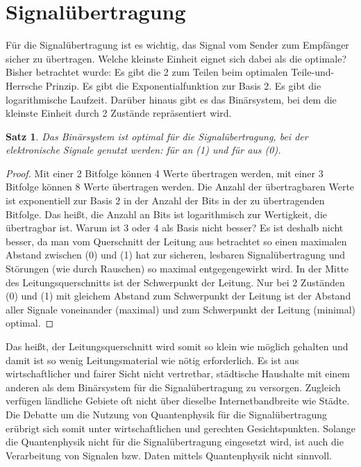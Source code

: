 \documentclass{scrartcl}
\newtheorem{satz}{Satz}[section]
\numberwithin{equation}{section}
\begin{document}
\section{Signalübertragung}
Für die Signalübertragung ist es wichtig, das Signal vom Sender zum Empfänger sicher zu übertragen. Welche kleinste Einheit eignet sich dabei als die optimale? Bisher betrachtet wurde: Es gibt die 2 zum Teilen beim optimalen Teile-und-Herrsche Prinzip. Es gibt die Exponentialfunktion zur Basis 2. Es gibt die logarithmische Laufzeit. Darüber hinaus gibt es das Binärsystem, bei dem die kleinste Einheit durch 2 Zustände repräsentiert wird.
\begin{satz}
	Das Binärsystem ist optimal für die Signalübertragung, bei der elektronische Signale genutzt werden: für an (1) und für aus (0).
\end{satz}
\begin{proof}
	Mit einer 2 Bitfolge können 4 Werte übertragen werden, mit einer 3 Bitfolge können 8 Werte übertragen werden. Die Anzahl der übertragbaren Werte ist exponentiell zur Basis 2 in der Anzahl der Bits in der zu übertragenden Bitfolge. Das heißt, die Anzahl an Bits ist logarithmisch zur Wertigkeit, die übertragbar ist. Warum ist 3 oder 4 als Basis nicht besser? Es ist deshalb nicht besser, da man vom Querschnitt der Leitung aus betrachtet so einen maximalen Abstand zwischen (0) und (1) hat zur sicheren, lesbaren Signalübertragung und Störungen (wie durch Rauschen) so maximal entgegengewirkt wird. In der Mitte des Leitungsquerschnitts ist der Schwerpunkt der Leitung. Nur bei 2 Zuständen (0) und (1) mit gleichem Abstand zum Schwerpunkt der Leitung ist der Abstand aller Signale voneinander (maximal) und zum Schwerpunkt der Leitung (minimal) optimal.	
\end{proof}
Das heißt, der Leitungsquerschnitt wird somit so klein wie möglich gehalten und damit ist so wenig Leitungsmaterial wie nötig erforderlich. Es ist aus wirtschaftlicher und fairer Sicht nicht vertretbar, städtische Haushalte mit einem anderen als dem Binärsystem für die Signalübertragung zu versorgen. Zugleich verfügen ländliche Gebiete oft nicht über dieselbe Internetbandbreite wie Städte. Die Debatte um die Nutzung von Quantenphysik für die Signalübertragung erübrigt sich somit unter wirtschaftlichen und gerechten Gesichtspunkten. Solange die Quantenphysik nicht für die Signalübertragung eingesetzt wird, ist auch die Verarbeitung von Signalen bzw. Daten mittels Quantenphysik nicht sinnvoll.
\end{document}
